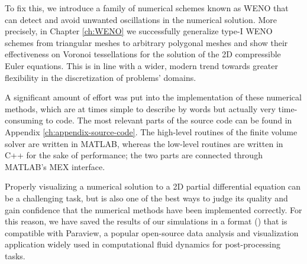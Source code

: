 To fix this, we introduce a family of numerical schemes known as WENO that can
detect and avoid unwanted oscillations in the numerical solution.
More precisely, in Chapter \ref{ch:WENO} we successfully generalize
type-I WENO schemes from triangular meshes to arbitrary polygonal
meshes and show their effectiveness on Voronoi tessellations for
the solution of the 2D compressible Euler equations.
This is in line with a wider, modern trend towards greater flexibility in
the discretization of problems’ domains.

A significant amount of effort was put into the implementation
of these numerical methods, which are at times simple to describe by
words but actually very time-consuming to code.
The most relevant parts of the source code can be found in Appendix
\ref{ch:appendix-source-code}. The high-level routines of the finite
volume solver are written in MATLAB, whereas the low-level routines
are written in C++ for the sake of performance; the two parts
are connected through MATLAB's MEX interface.

Properly visualizing a numerical solution to a 2D partial differential equation
can be a challenging task, but is also one of the best ways to judge its quality
and gain confidence that the numerical methods have been implemented correctly.
For this reason, we have saved the results of our simulations in a format
() that is compatible with Paraview, a popular open-source
data analysis and visualization application widely used in computational
fluid dynamics for post-processing tasks.

%
%
%














